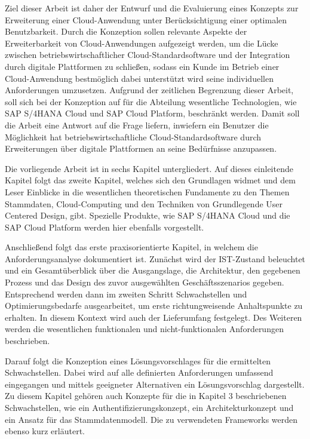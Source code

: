 Ziel dieser Arbeit ist daher der Entwurf und die Evaluierung eines Konzepts zur Erweiterung einer Cloud-Anwendung unter Berücksichtigung einer optimalen Benutzbarkeit. Durch die Konzeption sollen relevante Aspekte der Erweiterbarkeit von Cloud-Anwendungen aufgezeigt werden, um die Lücke zwischen betriebswirtschaftlicher Cloud-Standardsoftware und der Integration durch digitale Plattformen zu schließen, sodass ein Kunde im Betrieb einer Cloud-Anwendung bestmöglich dabei unterstützt wird seine individuellen Anforderungen umzusetzen. Aufgrund der zeitlichen Begrenzung dieser Arbeit, soll sich bei der Konzeption auf für die Abteilung wesentliche Technologien, wie SAP S/4HANA Cloud und SAP Cloud Platform, beschränkt werden. Damit soll die Arbeit eine Antwort auf die Frage liefern, inwiefern ein Benutzer die Möglichkeit hat betriebswirtschaftliche Cloud-Standardsoftware durch Erweiterungen über digitale Plattformen an seine Bedürfnisse anzupassen.

Die vorliegende Arbeit ist in sechs Kapitel untergliedert. Auf dieses einleitende Kapitel folgt das zweite Kapitel, welches sich den Grundlagen widmet und dem Leser Einblicke in die wesentlichen theoretischen Fundamente zu den Themen Stammdaten, Cloud-Computing und den Techniken von  Grundlegende User Centered Design, gibt. Spezielle Produkte, wie SAP S/4HANA Cloud und die SAP Cloud Platform werden hier ebenfalls vorgestellt.

Anschließend folgt das erste praxisorientierte Kapitel, in welchem die Anforderungsanalyse dokumentiert ist. Zunächst wird der IST-Zustand beleuchtet und ein Gesamtüberblick über die Ausgangslage, die Architektur, den gegebenen Prozess und das Design des zuvor ausgewählten Geschäftsszenarios gegeben. Entsprechend werden dann im zweiten Schritt Schwachstellen und Optimierungsbedarfe ausgearbeitet, um erste richtungweisende Anhaltspunkte zu erhalten. In diesem Kontext wird auch der Lieferumfang festgelegt. Des Weiteren werden die wesentlichen funktionalen und nicht-funktionalen Anforderungen beschrieben.

Darauf folgt die Konzeption eines Lösungsvorschlages für die ermittelten Schwachstellen. Dabei wird auf alle definierten Anforderungen umfassend eingegangen und mittels geeigneter Alternativen ein Lösungsvorschlag dargestellt. Zu diesem Kapitel gehören auch Konzepte für die in Kapitel 3 beschriebenen Schwachstellen, wie ein Authentifizierungskonzept, ein Architekturkonzept und ein Ansatz für das Stammdatenmodell. Die zu verwendeten Frameworks werden ebenso kurz erläutert.

